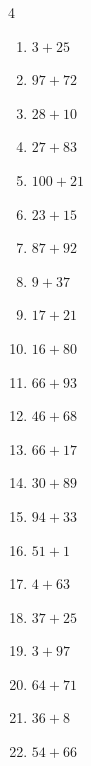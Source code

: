 \begin{multicols}{4}
\begin{enumerate}
  \item $3+25$
        \phantom{$=28$}

  \item $97+72$
        \phantom{$=169$}

  \item $28+10$
        \phantom{$=38$}

  \item $27+83$
        \phantom{$=110$}

  \item $100+21$
        \phantom{$=121$}

  \item $23+15$
        \phantom{$=38$}

  \item $87+92$
        \phantom{$=179$}

  \item $9+37$
        \phantom{$=46$}

  \item $17+21$
        \phantom{$=38$}

  \item $16+80$
        \phantom{$=96$}

  \item $66+93$
        \phantom{$=159$}

  \item $46+68$
        \phantom{$=114$}

  \item $66+17$
        \phantom{$=83$}

  \item $30+89$
        \phantom{$=119$}

  \item $94+33$
        \phantom{$=127$}

  \item $51+1$
        \phantom{$=52$}

  \item $4+63$
        \phantom{$=67$}

  \item $37+25$
        \phantom{$=62$}

  \item $3+97$
        \phantom{$=100$}

  \item $64+71$
        \phantom{$=135$}

  \item $36+8$
        \phantom{$=44$}

  \item $54+66$
        \phantom{$=120$}


\end{enumerate}
\end{multicols}
